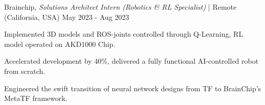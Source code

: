 
\begin{cventries2}


  \cventrynew
    {Brainchip, \textnormal{\textit{Solutions Architect Intern (Robotics \& RL Specialist)}
    | Remote (California, USA)}} %
    {May 2023 - Aug 2023} %
    {
      \begin{cvitems} %
        \item {Implemented 3D models and ROS-joints controlled through Q-Learning, RL model operated on AKD1000 Chip.}
        \item{Accelerated development by 40\%, delivered a fully functional AI-controlled robot from scratch.}
        \item {Engineered the swift transition of neural network designs from TF to BrainChip's MetaTF framework.}
      \end{cvitems}
    }




\end{cventries2}
